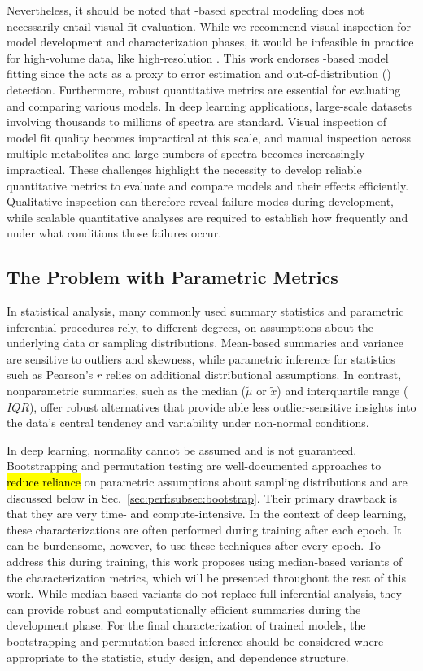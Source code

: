 Nevertheless, it should be noted that \DL-based spectral modeling does not necessarily entail visual fit evaluation. While we recommend visual inspection for model development and characterization phases, it would be infeasible in practice for high-volume data, like high-resolution \MRSI. This work endorses \DL-based model fitting since the \FQN acts as a proxy to error estimation and out-of-distribution (\OOD) detection. Furthermore, robust quantitative metrics are essential for evaluating and comparing various models. In deep learning applications, large-scale datasets involving thousands to millions of spectra are standard. Visual inspection of model fit quality becomes impractical at this scale, and manual inspection across multiple metabolites and large numbers of spectra becomes increasingly impractical. These challenges highlight the necessity to develop reliable quantitative metrics to evaluate and compare models and their effects efficiently. Qualitative inspection can therefore reveal failure modes during development, while scalable quantitative analyses are required to establish how frequently and under what conditions those failures occur.

\subsection{The Problem with Parametric Metrics}
\label{sec:perf:subsec:transitioning}
In statistical analysis, many commonly used summary statistics and parametric inferential procedures rely, to different degrees, on assumptions about the underlying data or sampling distributions. Mean-based summaries and variance are sensitive to outliers and skewness, while parametric inference for statistics such as Pearson's $r$ relies on additional distributional assumptions. In contrast, nonparametric summaries, such as the median ($\widetilde{\mu}$ or $\widetilde{x}$) and interquartile range ($IQR$), offer robust alternatives that provide able less outlier-sensitive insights into the data's central tendency and variability under non-normal conditions. 

In deep learning, normality cannot be assumed and is not guaranteed. Bootstrapping and permutat\-ion testing are well-documented approaches to \hl{reduce reliance} on parametric assumptions about sampling distributions and are discussed below in Sec.~\ref{sec:perf:subsec:bootstrap}. Their primary drawback is that they are very time- and compute-intensive. In the context of deep learning, these characterizations are often performed during training after each epoch. It can be burdensome, however, to use these techniques after every epoch. To address this during training, this work proposes using median-based variants of the characterization metrics, which will be presented throughout the rest of this work. While median-based variants do not replace full inferential analysis, they can provide robust and computationally efficient summaries during the development phase. For the final characterization of trained models, the bootstrapping and permutation-based inference should be considered where appropriate to the statistic, study design, and dependence structure.

